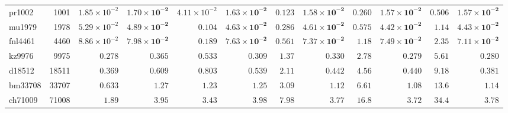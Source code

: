 \begin{table}[t]
{\begin{tabular}{@{}lr*{5}{rr}@{}}
pr1002 & 1001 & $1.85 \times 10^{-2}$ & $\mathbf{1.70 \times 10^{-2}}$ & $4.11 \times 10^{-2}$ & $\mathbf{1.63 \times 10^{-2}}$ & $0.123$ & $\mathbf{1.58 \times 10^{-2}}$ & $0.260$ & $\mathbf{1.57 \times 10^{-2}}$ & $0.506$ & $\mathbf{1.57 \times 10^{-2}}$ \\
mu1979 & 1978 & $5.29 \times 10^{-2}$ & $\mathbf{4.89 \times 10^{-2}}$ & $0.104$ & $\mathbf{4.63 \times 10^{-2}}$ & $0.286$ & $\mathbf{4.61 \times 10^{-2}}$ & $0.575$ & $\mathbf{4.42 \times 10^{-2}}$ & $1.14$ & $\mathbf{4.43 \times 10^{-2}}$ \\
fnl4461 & 4460 & $8.86 \times 10^{-2}$ & $\mathbf{7.98 \times 10^{-2}}$ & $0.189$ & $\mathbf{7.63 \times 10^{-2}}$ & $0.561$ & $\mathbf{7.37 \times 10^{-2}}$ & $1.18$ & $\mathbf{7.49 \times 10^{-2}}$ & $2.35$ & $\mathbf{7.11 \times 10^{-2}}$ \\
kz9976 & 9975 & $\mathbf{0.278}$ & $0.365$ & $0.533$ & $\mathbf{0.309}$ & $1.37$ & $\mathbf{0.330}$ & $2.78$ & $\mathbf{0.279}$ & $5.61$ & $\mathbf{0.280}$ \\
d18512 & 18511 & $\mathbf{0.369}$ & $0.609$ & $0.803$ & $\mathbf{0.539}$ & $2.11$ & $\mathbf{0.442}$ & $4.56$ & $\mathbf{0.440}$ & $9.18$ & $\mathbf{0.381}$ \\
bm33708 & 33707 & $\mathbf{0.633}$ & $1.27$ & $\mathbf{1.23}$ & $1.25$ & $3.09$ & $\mathbf{1.12}$ & $6.61$ & $\mathbf{1.08}$ & $13.6$ & $\mathbf{1.14}$ \\
ch71009 & 71008 & $\mathbf{1.89}$ & $3.95$ & $\mathbf{3.43}$ & $3.98$ & $7.98$ & $\mathbf{3.77}$ & $16.8$ & $\mathbf{3.72}$ & $34.4$ & $\mathbf{3.78}$ \\
\bottomrule
\end{tabular}%
}
\vspace{0.8em}
\end{table}
